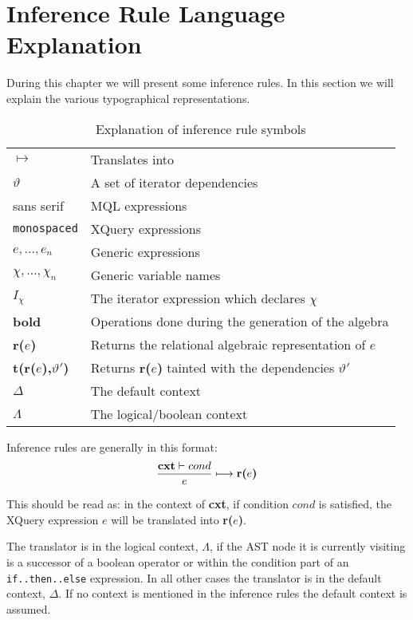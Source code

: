 \section{Inference Rule Language Explanation}
\label{sect:trans:TD:langExpl}
During this chapter we will present some inference rules. In this section we will explain the various
typographical representations.

\begin{table}[h]
\centering
\begin{tabular}{l|l}

  $\longmapsto$  			& Translates into \\
  $\vartheta$ 				& A set of iterator dependencies \\
  \textsf{sans serif} 		& MQL expressions \\
  \texttt{monospaced} 		& XQuery expressions \\
  $e,\ldots,e_{n}$			& Generic expressions \\
  $\chi,\ldots,\chi_{n}$	& Generic variable names \\
  $I_{\chi}$				& The iterator expression which declares $\chi$ \\
  \textbf{bold} 			& Operations done during the generation of the algebra \\
  \textbf{r(}$e$\textbf{)} 	& Returns the relational algebraic representation of $e$   \\
  \textbf{t(}\textbf{r(}$e$\textbf{)}\textbf{,}$\vartheta'$\textbf{)} & Returns \textbf{r(}$e$\textbf{)} tainted
  with the dependencies $\vartheta'$ \\
  $\Delta$ 					&  The default context \\ 
  $\Lambda$ 				& The logical/boolean context \\
  
\end{tabular}
\caption{Explanation of inference rule symbols}
\label{tab:trans:td:langExpl}
\end{table}

Inference rules are generally in this format:
\begin{equation*}
\frac{\mbox{\textbf{cxt}}\vdash cond}{e}\longmapsto \mbox{\textbf{r(}}e\mbox{\textbf{)}}
\end{equation*}

This should be read as: in the context of \textbf{cxt}, if condition $cond$ is satisfied, the XQuery expression
$e$ will be translated into \textbf{r(}$e$\textbf{)}.

The translator is in the logical context, $\Lambda$, if the AST node it is currently visiting is a successor of a
boolean operator or within the condition part of an \texttt{if..then..else} expression. In all other cases the
translator is in the default context, $\Delta$. If no context is mentioned in the inference rules the default
context is assumed.

